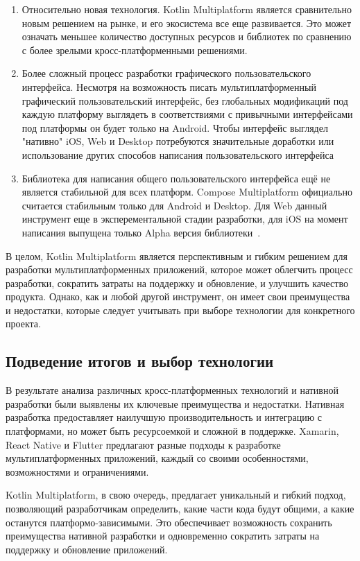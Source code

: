 \documentclass[14pt, russian]{scrartcl}
\begin{document}
\begin{enumerate}
    \item Относительно новая технология. Kotlin Multiplatform является сравнительно новым решением на рынке, и его экосистема все еще развивается. Это может означать меньшее количество доступных ресурсов и библиотек по сравнению с более зрелыми кросс-платформенными решениями.
    \item Более сложный процесс разработки графического пользовательского интерфейса. Несмотря на возможность писать мультиплатформенный графический пользовательский интерфейс, без глобальных модификаций под каждую платформу выглядеть в соответствиями с привычными интерфейсами под платформы он будет только на Android. Чтобы интерфейс выглядел "нативно"{} iOS, Web и Desktop потребуются значительные доработки или использование других способов написания пользовательского интерфейса
    \item Библиотека для написания общего пользовательского интерфейса ещё не является стабильной для всех платформ. Compose Multiplatform официально считается стабильным только для Android и Desktop. Для Web данный инструмент еще в эксперементальной стадии разработки, для iOS на момент написания выпущена только Alpha версия библиотеки~\cite{ComposeMPiOS}.
\end{enumerate}

В целом, Kotlin Multiplatform является перспективным и гибким решением для разработки мультиплатформенных приложений, которое может облегчить процесс разработки, сократить затраты на поддержку и обновление, и улучшить качество продукта. Однако, как и любой другой инструмент, он имеет свои преимущества и недостатки, которые следует учитывать при выборе технологии для конкретного проекта.

\subsection{Подведение итогов и выбор технологии}\label{sect:review-conclusion}

В результате анализа различных кросс-платформенных технологий и нативной разработки были выявлены их ключевые преимущества и недостатки. Нативная разработка предоставляет наилучшую производительность и интеграцию с платформами, но может быть ресурсоемкой и сложной в поддержке. Xamarin, React Native и Flutter предлагают разные подходы к разработке мультиплатформенных приложений, каждый со своими особенностями, возможностями и ограничениями.

Kotlin Multiplatform, в свою очередь, предлагает уникальный и гибкий подход, позволяющий разработчикам определить, какие части кода будут общими, а какие останутся платформо-зависимыми. Это обеспечивает возможность сохранить преимущества нативной разработки и одновременно сократить затраты на поддержку и обновление приложений.
\end{document}
